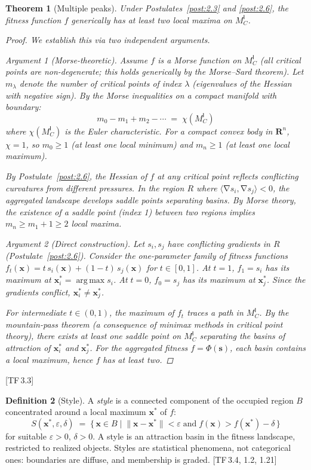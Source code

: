 \documentclass[10pt]{article}
\theoremstyle{definition}
\newtheorem{definition}{Definition}[section]
\theoremstyle{plain}
\newtheorem{theorem}[definition]{Theorem}
\theoremstyle{remark}
\newcommand{\MC}{M^{\mathsf{I}}_C}          %
\providecommand{\Rn}{}
\renewcommand{\Rn}{\mathbf{R}^n}            %
\newcommand{\inner}[2]{\langle #1, #2 \rangle}
\newcommand{\norm}[1]{\lVert #1 \rVert}
\DeclareMathOperator{\grad}{\nabla}
\DeclareMathOperator{\argmax}{arg\,max}
\newcommand{\TF}[1]{\textnormal{[TF\,#1]}}  %
\begin{document}
\begin{theorem}[Multiple peaks]\label{thm:3.3}
Under Postulates~\ref{post:2.3} and \ref{post:2.6}, the fitness function
$f$ generically has at least two local maxima on $\MC$.

\begin{proof}
We establish this via two independent arguments.

\medskip\noindent\textit{Argument 1 (Morse-theoretic).}\;
Assume $f$ is a Morse function on $\MC$ (all critical points are
non-degenerate; this holds generically by the Morse--Sard theorem).
Let $m_\lambda$ denote the number of critical points of index $\lambda$
(eigenvalues of the Hessian with negative sign). By the Morse
inequalities on a compact manifold with boundary:
\[
  m_0 - m_1 + m_2 - \cdots \;=\; \chi(\MC)
\]
where $\chi(\MC)$ is the Euler characteristic. For a compact convex
body in $\Rn$, $\chi = 1$, so $m_0 \geq 1$ (at least one local
minimum) and $m_n \geq 1$ (at least one local maximum).

By Postulate~\ref{post:2.6}, the Hessian of $f$ at any critical point
reflects conflicting curvatures from different pressures. In the region
$R$ where $\inner{\grad s_i}{\grad s_j} < 0$, the aggregated landscape
develops saddle points separating basins. By Morse theory, the existence
of a saddle point (index 1) between two regions implies
$m_n \geq m_1 + 1 \geq 2$ local maxima.

\medskip\noindent\textit{Argument 2 (Direct construction).}\;
Let $s_i, s_j$ have conflicting gradients in $R$ (Postulate~\ref{post:2.6}).
Consider the one-parameter family of fitness functions
$f_t(\bm{x}) = t \, s_i(\bm{x}) + (1-t) \, s_j(\bm{x})$ for
$t \in [0,1]$. At $t = 1$, $f_1 = s_i$ has its maximum at
$\bm{x}_i^* = \argmax s_i$. At $t = 0$, $f_0 = s_j$ has its maximum
at $\bm{x}_j^*$. Since the gradients conflict, $\bm{x}_i^* \neq \bm{x}_j^*$.

For intermediate $t \in (0,1)$, the maximum of $f_t$ traces a path in
$\MC$. By the mountain-pass theorem (a consequence of minimax methods
in critical point theory), there exists at least one saddle point on
$\MC$ separating the basins of attraction of $\bm{x}_i^*$ and
$\bm{x}_j^*$. For the aggregated fitness $f = \Phi(\bm{s})$, each
basin contains a local maximum, hence $f$ has at least two. \qedhere
\end{proof}
\end{theorem}

\TF{3.3}

\begin{definition}[Style]\label{def:3.4}
A \emph{style} is a connected component of the occupied region $B$
concentrated around a local maximum $\bm{x}^*$ of $f$:
\[
  S(\bm{x}^*, \varepsilon, \delta) \;=\;
  \bigl\{\, \bm{x} \in B \;\big|\;
    \norm{\bm{x} - \bm{x}^*} < \varepsilon
    \;\text{and}\;
    f(\bm{x}) > f(\bm{x}^*) - \delta
  \,\bigr\}
\]
for suitable $\varepsilon > 0$, $\delta > 0$. A style is an attraction
basin in the fitness landscape, restricted to realized objects.
Styles are statistical phenomena, not categorical ones: boundaries are
diffuse, and membership is graded. \TF{3.4, 1.2, 1.21}
\end{definition}
\end{document}
